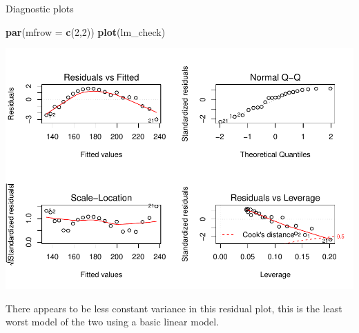 \documentclass[]{article}
\newenvironment{Shaded}{\begin{snugshade}}{\end{snugshade}}
\newcommand{\KeywordTok}[1]{\textcolor[rgb]{0.13,0.29,0.53}{\textbf{{#1}}}}
\newcommand{\DataTypeTok}[1]{\textcolor[rgb]{0.13,0.29,0.53}{{#1}}}
\newcommand{\DecValTok}[1]{\textcolor[rgb]{0.00,0.00,0.81}{{#1}}}
\newcommand{\NormalTok}[1]{{#1}}
\begin{document}
\newpage

Diagnostic plots

\begin{Shaded}
\begin{Highlighting}[]
\KeywordTok{par}\NormalTok{(}\DataTypeTok{mfrow =} \KeywordTok{c}\NormalTok{(}\DecValTok{2}\NormalTok{,}\DecValTok{2}\NormalTok{))}
\KeywordTok{plot}\NormalTok{(lm_check)}
\end{Highlighting}
\end{Shaded}

\includegraphics{Christophe_Hunt_hw5_files/figure-latex/unnamed-chunk-18-1.pdf}

There appears to be less constant variance in this residual plot, this
is the least worst model of the two using a basic linear model.
\end{document}

